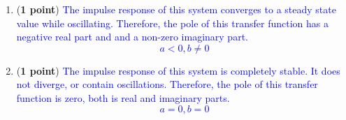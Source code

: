\documentclass[]{article}
\begin{document}
\begin{enumerate}
\begin{enumerate}
        \item (\textbf{1 point}) %
        \textcolor{blue}{
        The impulse response of this system converges to a steady state value while oscillating. Therefore, the pole of this transfer function has a negative real part and and a non-zero imaginary part.\\
        $$a < 0,b \neq 0$$
        }

        \item (\textbf{1 point}) %
        \textcolor{blue}{
        The impulse response of this system is completely stable. It does not diverge, or contain oscillations. Therefore, the pole of this transfer function is zero, both is real and imaginary parts.\\
        $$a = 0,b = 0$$
        }
    \end{enumerate}


\end{enumerate}
\end{document}
